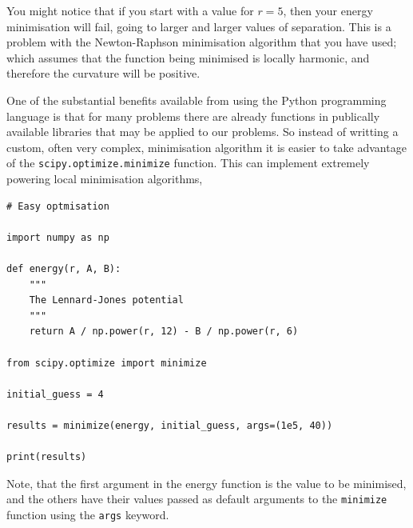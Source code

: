 \documentclass[a4paper]{article}
\begin{document}
You might notice that if you start with a value for $r = 5$, then your energy minimisation will fail, going to larger and larger values of separation.
This is a problem with the Newton-Raphson minimisation algorithm that you have used; which assumes that the function being minimised is locally harmonic, and therefore the curvature will be positive.

One of the substantial benefits available from using the Python programming language is that for many problems there are already functions in publically available libraries that may be applied to our problems.
So instead of writting a custom, often very complex, minimisation algorithm it is easier to take advantage of the \texttt{scipy.optimize.minimize} function.
This can implement extremely powering local minimisation algorithms,
\begin{lstlisting}
# Easy optmisation

import numpy as np

def energy(r, A, B):
    """
    The Lennard-Jones potential
    """
    return A / np.power(r, 12) - B / np.power(r, 6)

from scipy.optimize import minimize

initial_guess = 4

results = minimize(energy, initial_guess, args=(1e5, 40))

print(results)
\end{lstlisting}
Note, that the first argument in the energy function is the value to be minimised, and the others have their values passed as default arguments to the \texttt{minimize} function using the \texttt{args} keyword.
\vspace{\baselineskip}
\begin{center}
	\noindent{}
\end{center}
\end{document}
